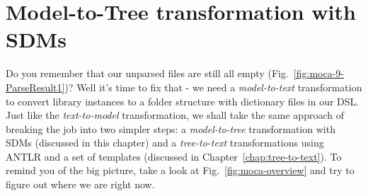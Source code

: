 \section{Model-to-Tree transformation with SDMs}
\label{chap:model-to-tree}
Do you remember that our unparsed files are still all empty (Fig.~\ref{fig:moca-9-ParseResult1})?
Well it's time to fix that - we need a \emph{model-to-text} transformation to convert library instances to a folder structure with dictionary files in our DSL.
Just like the \emph{text-to-model} transformation, we shall take the same approach of breaking the job into two simpler steps:  a \emph{model-to-tree} transformation  with SDMs (discussed in this chapter) and a \emph{tree-to-text} transformations using ANTLR and a set of templates (discussed in Chapter~\ref{chap:tree-to-text}).
To remind you of the big picture, take a look at Fig.~\ref{fig:moca-overview} and try to figure out where we are right now.

